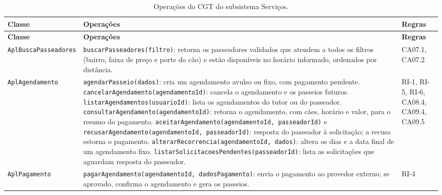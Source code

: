 \begin{footnotesize}
\begin{longtable}{|p{3.4cm}|p{7.6cm}|p{2.4cm}|}
	\caption{Operações do CGT do subsistema Serviços.}
	\label{tabela-cgt-servicos}\\\hline

	\rowcolor{lightgray}
	\textbf{Classe} & \textbf{Operações} & \textbf{Regras} \\\hline
	\endfirsthead
	\hline
	\rowcolor{lightgray}
	\textbf{Classe} & \textbf{Operações} & \textbf{Regras} \\\hline
	\endhead

	\texttt{AplBuscaPasseadores} & \texttt{buscarPasseadores(filtro)}: retorna os passeadores validados que atendem a todos os filtros (bairro, faixa de preço e porte do cão) e estão disponíveis no horário informado, ordenados por distância. & CA07.1, CA07.2 \\\hline

	\texttt{AplAgendamento} & \texttt{agendarPasseio(dados)}: cria um agendamento avulso ou fixo, com pagamento pendente. \newline
	\texttt{cancelarAgendamento(agendamentoId)}: cancela o agendamento e os passeios futuros. \newline
	\texttt{listarAgendamentos(usuarioId)}: lista os agendamentos do tutor ou do passeador. \newline
	\texttt{consultarAgendamento(agendamentoId)}: retorna o agendamento, com cães, horário e valor, para o resumo do pagamento. \newline
	\texttt{aceitarAgendamento(agendamentoId, passeadorId)} e \texttt{recusarAgendamento(agendamentoId, passeadorId)}: resposta do passeador à solicitação; a recusa estorna o pagamento. \newline
	\texttt{alterarRecorrencia(agendamentoId, dados)}: altera os dias e a data final de um agendamento fixo. \newline
	\texttt{listarSolicitacoesPendentes(passeadorId)}: lista as solicitações que aguardam resposta do passeador. & RI-1, RI-5, RI-6, CA08.4, CA09.4, CA09.5 \\\hline

	\texttt{AplPagamento} & \texttt{pagarAgendamento(agendamentoId, dadosPagamento)}: envia o pagamento ao provedor externo; se aprovado, confirma o agendamento e gera os passeios. & RI-4 \\\hline


\end{longtable}
\end{footnotesize}

